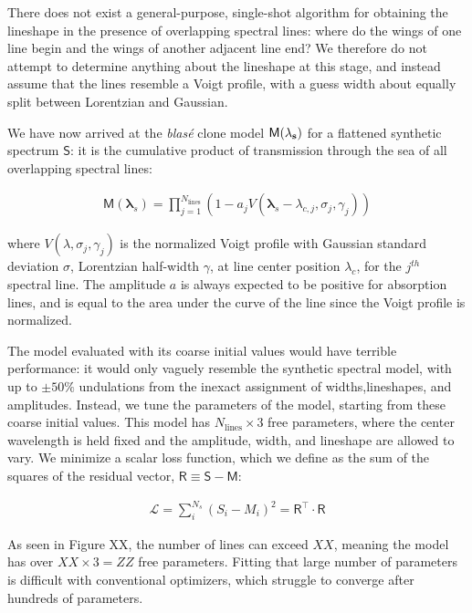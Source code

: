 \documentclass[modern]{aastex631}
\begin{document}
There does not exist a general-purpose, single-shot algorithm for obtaining the lineshape in the presence of overlapping spectral lines: where do the wings of one line begin and the wings of another adjacent line end?  We therefore do not attempt to determine anything about the lineshape at this stage, and instead assume that the lines resemble a Voigt profile, with a guess width about equally split between Lorentzian and Gaussian.

We have now arrived at the \emph{blas\'e} clone model $\mathsf{M}(\bf{\lambda}_s)$ for a flattened synthetic spectrum $\mathsf{S}$: it is the cumulative product of transmission through the sea of all overlapping spectral lines:

\begin{eqnarray}
  \mathsf{M}(\bm{\lambda}_s) = {\displaystyle \prod_{j=1}^{N_{\mathrm{lines}}}  (1-a_j V(\bm{\lambda}_s-\lambda_{c,j}, \sigma_j, \gamma_j) )}
\end{eqnarray}

where $V(\lambda, \sigma_j, \gamma_j)$ is the normalized Voigt profile with Gaussian standard deviation $\sigma$, Lorentzian half-width $\gamma$, at line center position $\lambda_c$, for the $j^{th}$ spectral line.  The amplitude $a$ is always expected to be positive for absorption lines, and is equal to the area under the curve of the line since the Voigt profile is normalized.

The model evaluated with its coarse initial values would have terrible performance: it would only vaguely resemble the synthetic spectral model, with up to $\pm 50\%$ undulations from the inexact assignment of widths,lineshapes, and amplitudes.  Instead, we tune the parameters of the model, starting from these coarse initial values.  This model has $N_{\mathrm{lines}}\times 3$ free parameters, where the center wavelength is held fixed and the amplitude, width, and lineshape are allowed to vary.  We minimize a scalar loss function, which we define as the sum of the squares of the residual vector, $\mathsf{R} \equiv \mathsf{S}-\mathsf{M}$:

\begin{eqnarray}
  \mathcal{L} = \sum_i^{N_s} (S_i - M_i)^2 = \mathsf{R^\intercal}\cdot \mathsf{R}
\end{eqnarray}


As seen in Figure XX, the number of lines can exceed $XX$, meaning the model has over $XX \times 3 = ZZ$ free parameters.  Fitting that large number of parameters is difficult with conventional optimizers, which struggle to converge after hundreds of parameters.
\end{document}

